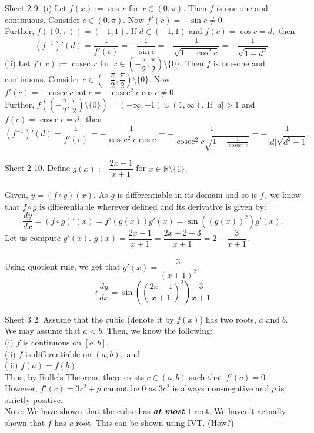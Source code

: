 \documentclass[handout, aspectratio=169]{beamer}
\newcommand{\cosec}{\operatorname{cosec}}
\begin{document}
\begin{frame}{Sheet 2}
	9. (i) Let $f(x) := \cos x$ for $x \in (0, \pi).$ Then $f$ is one-one and continuous. Consider $c \in (0, \pi).$ Now $f'(c) = -\sin c \neq 0.$\\
	Further, $f\left((0, \pi)\right) = (-1, 1).$ If $d \in (-1, 1)$ and $f(c) = \cos c = d,$ then
	\[(f^{-1})'(d) = \dfrac{1}{f'(c)} = -\dfrac{1}{\sin c} = - \dfrac{1}{\sqrt{1 - \cos^2c}} = - \dfrac{1}{\sqrt{1 - d^2}}.\]
	(ii) Let $f(x) := \cosec x$ for $x \in \left(-\dfrac{\pi}{2}, \dfrac{\pi}{2}\right)\setminus\{0\}.$ Then $f$ is one-one and continuous. Consider $c \in \left(-\dfrac{\pi}{2}, \dfrac{\pi}{2}\right)\setminus\{0\}.$ Now $f'(c) = -\cosec c\cot c = -\cosec^2 c\cos c \neq 0.$\\
	Further, $f\left(\left(-\dfrac{\pi}{2}, \dfrac{\pi}{2}\right)\setminus\{0\}\right) = (-\infty, -1)\cup(1, \infty).$ If $|d| > 1$ and $f(c) = \cosec c= d,$ then
	\[(f^{-1})'(d) = \dfrac{1}{f'(c)} = - \dfrac{1}{\cosec^2 c \cos c} = - \dfrac{1}{\cosec^2 c \sqrt{1 - \frac{1}{\cosec^2 c}}} = - \dfrac{1}{|d|\sqrt{d^2 - 1}}.\]
\end{frame}
\begin{frame}{Sheet 2}
	10. Define $g(x) := \dfrac{2x - 1}{x + 1}$ for $x \in \mathbb{R}\setminus\{1\}.$\\~\\
	Given, $y = (f\circ g)(x).$ As $g$ is differentiable in its domain and so is $f,$ we know that $f\circ g$ is differentiable wherever defined and its derivative is given by:
	\[\dfrac{dy}{dx} = (f\circ g)'(x) = f'(g(x))g'(x) = \sin\left((g(x))^2\right)g'(x).\]
	Let us compute $g'(x).$
	$g(x) = \dfrac{2x - 1}{x + 1} = \dfrac{2x + 2 - 3}{x + 1} = 2 - \dfrac{3}{x+1}.$\\~\\
	Using quotient rule, we get that $g'(x) = \dfrac{3}{(x+1)^2}.$
	\[\therefore \dfrac{dy}{dx} = \sin\left(\left(\dfrac{2x - 1}{x+1}\right)^2\right)\dfrac{3}{x+1}\]
\end{frame}
\begin{frame}{Sheet 3}
	2. Assume that the cubic (denote it by $f(x)$) has two roots, $a$ and $b.$ We may assume that $a < b.$ Then, we know the following:\\
	(i) $f$ is continuous on $[a, b],$\\
	(ii) $f$ is differentiable on $(a, b),$ and\\
	(iii) $f(a) = f(b).$\\
	Thus, by Rolle's Theorem, there exists $c \in (a, b)$ such that $f'(c) = 0.$\\
	However, $f'(c) = 3c^2 + p$ cannot be $0$ as $3c^2$ is always non-negative and $p$ is strictly positive.\\
	Note: We have shown that the cubic has \textbf{\emph{at most}} $1$ root. We haven't actually shown that $f$ has \emph{a} root. This can be shown using IVT. (How?)
\end{frame}
\end{document}
